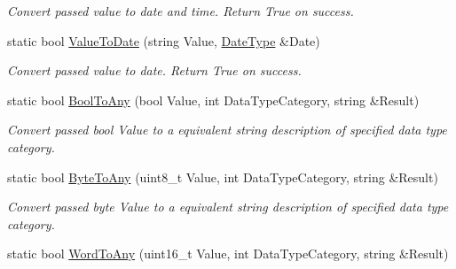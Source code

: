 \begin{DoxyCompactItemize}
\begin{DoxyCompactList}\small\item\em Convert passed value to date and time. Return True on success. \end{DoxyCompactList}\item 
static bool \hyperlink{classpc__emulator_1_1DataTypeUtils_ad9dabf2772efc07427b69ac733dc3f33}{Value\+To\+Date} (string Value, \hyperlink{structpc__emulator_1_1DateDataType}{Date\+Type} \&Date)\hypertarget{classpc__emulator_1_1DataTypeUtils_ad9dabf2772efc07427b69ac733dc3f33}{}\label{classpc__emulator_1_1DataTypeUtils_ad9dabf2772efc07427b69ac733dc3f33}

\begin{DoxyCompactList}\small\item\em Convert passed value to date. Return True on success. \end{DoxyCompactList}\item 
static bool \hyperlink{classpc__emulator_1_1DataTypeUtils_a6b442f726a053b8f3e2982744ce1b939}{Bool\+To\+Any} (bool Value, int Data\+Type\+Category, string \&Result)\hypertarget{classpc__emulator_1_1DataTypeUtils_a6b442f726a053b8f3e2982744ce1b939}{}\label{classpc__emulator_1_1DataTypeUtils_a6b442f726a053b8f3e2982744ce1b939}

\begin{DoxyCompactList}\small\item\em Convert passed bool Value to a equivalent string description of specified data type category. \end{DoxyCompactList}\item 
static bool \hyperlink{classpc__emulator_1_1DataTypeUtils_a53d055de7df09456a91f70803040997f}{Byte\+To\+Any} (uint8\+\_\+t Value, int Data\+Type\+Category, string \&Result)\hypertarget{classpc__emulator_1_1DataTypeUtils_a53d055de7df09456a91f70803040997f}{}\label{classpc__emulator_1_1DataTypeUtils_a53d055de7df09456a91f70803040997f}

\begin{DoxyCompactList}\small\item\em Convert passed byte Value to a equivalent string description of specified data type category. \end{DoxyCompactList}\item 
static bool \hyperlink{classpc__emulator_1_1DataTypeUtils_acab946275296df9246950cff4bfac8d4}{Word\+To\+Any} (uint16\+\_\+t Value, int Data\+Type\+Category, string \&Result)\hypertarget{classpc__emulator_1_1DataTypeUtils_acab946275296df9246950cff4bfac8d4}{}\label{classpc__emulator_1_1DataTypeUtils_acab946275296df9246950cff4bfac8d4}


\end{DoxyCompactItemize}
